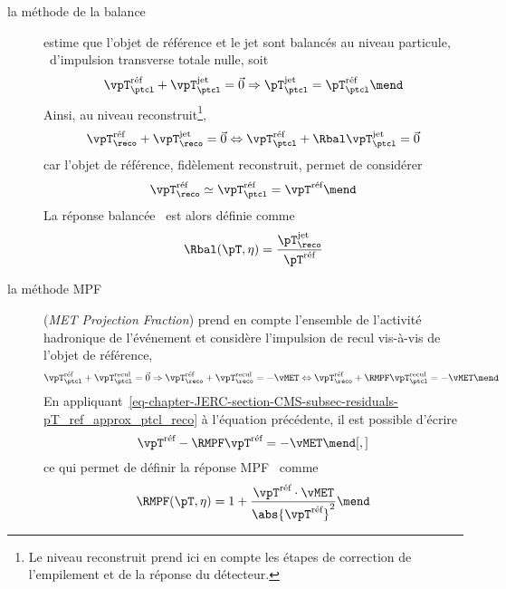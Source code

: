 \begin{description}
\item[la méthode de la balance] estime que l'objet de référence et le jet sont balancés au niveau particule, \ie\ d'impulsion transverse totale nulle, soit
\begin{equation}
\vpT_\ptcl^\text{réf} + \vpT_\ptcl^\text{jet} = \vec{0}
\Rightarrow
\pT_\ptcl^\text{jet} = \pT_\ptcl^\text{réf}
\mend
\end{equation}
Ainsi, au niveau reconstruit\footnote{Le niveau reconstruit prend ici en compte les étapes de correction de l'empilement et de la réponse du détecteur.},
\begin{equation}
\vpT_\reco^\text{réf} + \vpT_\reco^\text{jet} = \vec{0}
\Leftrightarrow
\vpT_\ptcl^\text{réf} + \Rbal\vpT_\ptcl^\text{jet} = \vec{0}
\end{equation}
car l'objet de référence, fidèlement reconstruit, permet de considérer
\begin{equation}
\vpT_\reco^\text{réf} \simeq \vpT_\ptcl^\text{réf} = \vpT^\text{réf}
\mend
\label{eq-chapter-JERC-section-CMS-subsec-residuals-pT_ref_approx_ptcl_reco}
\end{equation}
La réponse balancée \Rbal\ est alors définie comme
\begin{equation}
\Rbal (\pT, \eta) = \frac{\pT_\reco^\text{jet}}{\pT^\text{réf}}
\label{eq-chapter-JERC-section-CMS-subsec-residuals-Rbal_def}
\end{equation}
\item[la méthode \og MPF \fg] (\emph{MET Projection Fraction}) prend en compte l'ensemble de l'activité hadronique de l'événement et considère l'impulsion de recul vis-à-vis de l'objet de référence, \ie
\begin{equation}
\vpT_\ptcl^\text{réf} + \vpT_\ptcl^\text{recul} = \vec{0}
\Rightarrow
\vpT_\reco^\text{réf} + \vpT_\reco^\text{recul} = -\vMET
\Leftrightarrow
\vpT_\reco^\text{réf} + \RMPF\vpT_\ptcl^\text{recul} = -\vMET
\mend
\end{equation}
En appliquant~\eqref{eq-chapter-JERC-section-CMS-subsec-residuals-pT_ref_approx_ptcl_reco} à l'équation précédente, il est possible d'écrire
\begin{equation}
\vpT^\text{réf} - \RMPF\vpT^\text{réf} = -\vMET
\mend[,]
\end{equation}
ce qui permet de définir la réponse MPF \RMPF\ comme
\begin{equation}
\RMPF (\pT, \eta) = 1 + \frac{\vpT^\text{réf}\cdot\vMET}{\abs{\vpT^\text{réf}}^2}
\mend
\end{equation}
\end{description}
